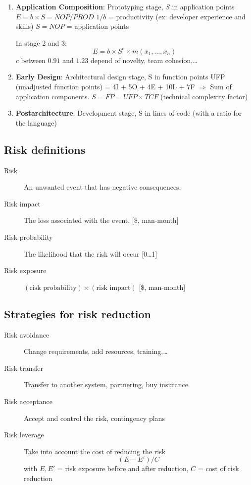 \begin{enumerate}
    \item \textbf{Application Composition}: Prototyping stage, \textcolor{red!80!black}{$S$ in application points}
        \subitem{} $E = b \times S = NOP / PROD$
        \subitem{} $1 / b$ = productivity (ex: developer experience and skills)
        \subitem{} $S = NOP$ = application points

    \begin{framed}
        In stage 2 and 3:
        $$E = b \times S^{c} \times m({x}_{1},\ldots, {x}_{n})$$
        $c$ between $0.91$ and $1.23$ depend of novelty, team cohesion,\ldots
    \end{framed}
    \item \textbf{Early Design}: Architectural design stage, \textcolor{red!80!black}{S in function points}
        \subitem{} UFP (unadjusted function points) = 4I + 5O + 4E + 10L
        + 7F $\Rightarrow$   Sum of application components.
        \subitem{} $S = FP = UFP \times TCF$ (technical complexity factor)

    \item \textbf{Postarchitecture}: Development stage,
        \textcolor{red!80!black}{S in lines of code} (with a ratio for
        the language)
\end{enumerate}

\subsection{Risk definitions}

\begin{description}
    \item[Risk] An unwanted event that has negative consequences.
    \item[Risk impact] The loss associated with the event. [\$, man-month]
    \item[Risk probability] The likelihood that the risk will occur [0\ldots1]
    \item[Risk exposure] $(\textrm{risk probability}) \times (\textrm{risk impact})$ [\$, man-month]
\end{description}

\subsection{Strategies for risk reduction}

\begin{description}
    \item[Risk avoidance] Change requirements, add resources, training,\ldots
    \item[Risk transfer] Transfer to another system, partnering, buy insurance
    \item[Risk acceptance] Accept and control the risk, contingency plans
    \item[Risk leverage] Take into account the cost of reducing the risk
    $$(E - E')/C$$
with $E, E'$ = risk exposure before and after reduction,
$C$ = cost of risk reduction

\end{description}
